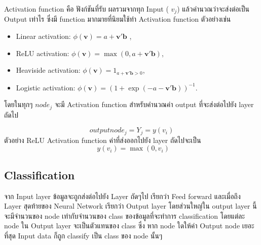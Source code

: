 Activation function \cite{Activation} คือ ฟังก์ชันที่รับ ผลรวมจากทุก Input ( $v_j $)  แล้วคำนวณว่าจะส่งต่อเป็น Output เท่าไร
ซึ่งมี function มากมายที่นิยมใช้ทำ Activation function ตัวอย่างเช่น
\begin{itemize}
  \item Linear activation:  ${\displaystyle \phi (\mathbf {v} )=a+\mathbf {v} '\mathbf {b} }$ ,
  \item ReLU activation: ${\displaystyle \phi (\mathbf {v} )=\max(0,a+\mathbf {v} '\mathbf {b} )}$,
  \item Heaviside activation: ${\displaystyle \phi (\mathbf {v} )=1_{a+\mathbf {v} '\mathbf {b} >0}}$,
  \item Logistic activation: ${\displaystyle \phi (\mathbf {v} )=(1+\exp(-a-\mathbf {v} '\mathbf {b} ))^{-1}}$.
\end{itemize}

โดยในทุกๆ $node_j$ จะมี Activation function สำหรับคำนวณค่า output ที่จะส่งต่อไปยัง layer ถัดไป

\begin{equation} output node_j =  Y_j =  y(v_i)  \end{equation}
ตัวอย่าง ReLU Activation function ค่าที่ส่งออกไปยัง layer ถัดไปจะเป็น
\begin{equation} ~~ y(v_i) = \max(0,v_i)
\end{equation}

\subsection{Classification}
จาก Input layer ข้อมูลจะถูกส่งต่อไปยัง Layer ถัดๆไป เรียกว่า Feed forward และเมื่อถึง
Layer สุดท้ายของ Neural Network เรียกว่า Output layer โดยส่วนใหญ่ใน output layer นี้จะมีจำนวนของ node เท่ากับจำนวนของ class ของข้อมูลที่จะทำการ classification
โดยแต่ละ node ใน Output layer จะเป็นตัวแทนของ class ซึ่ง หาก node ใดให้ค่า Output node เยอะที่สุด Input data ก็ถูก classify เป็น class ของ node นั้นๆ



